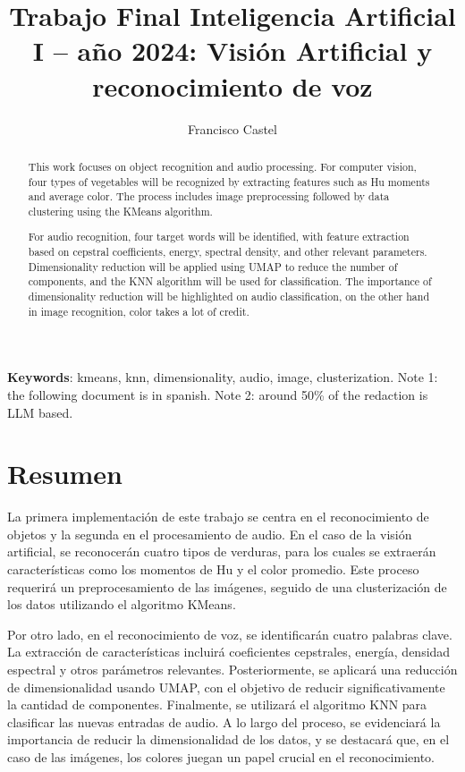 \documentclass[12pt,a4paper]{article}
\title{Trabajo Final Inteligencia Artificial I – año 2024: Visión Artificial y reconocimiento de 
voz}
\author{Francisco Castel}
\affil{\small Facultad de Ingenieria, UNCUYO, 13784,  \texttt{castel.francisco@uncuyo.edu}}
\date{}  %
\begin{document}
\maketitle
\renewcommand{\abstractname}{Abstract}

\begin{abstract}
This work focuses on object recognition and audio processing. For computer vision, four types of vegetables will be recognized by extracting features such as Hu moments and average color. The process includes image preprocessing followed by data clustering using the KMeans algorithm.

For audio recognition, four target words will be identified, with feature extraction based on cepstral coefficients, energy, spectral density, and other relevant parameters. Dimensionality reduction will be applied using UMAP to reduce the number of components, and the KNN algorithm will be used for classification. The importance of dimensionality reduction will be highlighted on audio classification, on the other hand in image recognition, color takes a lot of credit.

\end{abstract}

\textbf{Keywords}: kmeans, knn, dimensionality, audio, image, clusterization.  
\newline
\newline
\newline
\newline
{\scriptsize Note 1: the following document is in spanish.}
\newline
{\scriptsize Note 2: around 50\% of the redaction is LLM based.}

\newpage
\section{Resumen}
La primera implementación de este trabajo se centra en el reconocimiento de objetos y la segunda en el procesamiento de audio. En el caso de la visión artificial, se reconocerán cuatro tipos de verduras, para los cuales se extraerán características como los momentos de Hu y el color promedio. Este proceso requerirá un preprocesamiento de las imágenes, seguido de una clusterización de los datos utilizando el algoritmo KMeans.

Por otro lado, en el reconocimiento de voz, se identificarán cuatro palabras clave. La extracción de características incluirá coeficientes cepstrales, energía, densidad espectral y otros parámetros relevantes. Posteriormente, se aplicará una reducción de dimensionalidad usando UMAP, con el objetivo de reducir significativamente la cantidad de componentes. Finalmente, se utilizará el algoritmo KNN para clasificar las nuevas entradas de audio. A lo largo del proceso, se evidenciará la importancia de reducir la dimensionalidad de los datos, y se destacará que, en el caso de las imágenes, los colores juegan un papel crucial en el reconocimiento.
\end{document}
